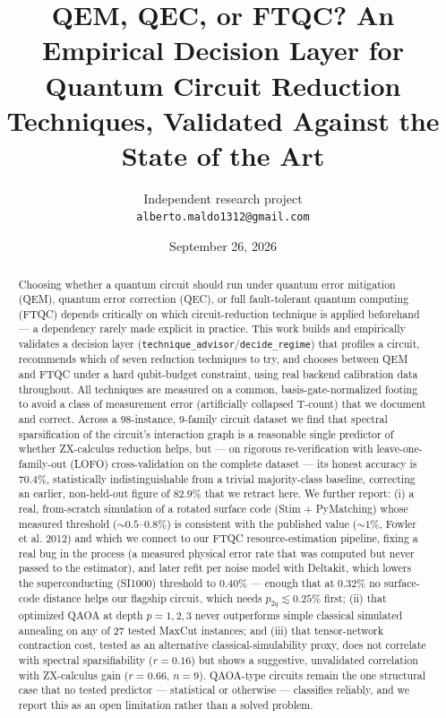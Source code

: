 \documentclass[9pt,twocolumn]{extarticle}
\title{\vspace{-1.2cm}\textbf{QEM, QEC, or FTQC? An Empirical Decision Layer for\\
Quantum Circuit Reduction Techniques, Validated Against the State of the Art}}
\author{\footnotesize Independent research project \\[-2pt]
\footnotesize \texttt{alberto.maldo1312@gmail.com}}
\date{\footnotesize September 26, 2026}
\begin{document}
\maketitle

\begin{abstract}
\noindent
Choosing whether a quantum circuit should run under quantum error mitigation
(QEM), quantum error correction (QEC), or full fault-tolerant quantum
computing (FTQC) depends critically on which circuit-reduction technique is
applied beforehand --- a dependency rarely made explicit in practice. This
work builds and empirically validates a decision layer
(\texttt{technique\_advisor}/\texttt{decide\_regime}) that profiles a circuit,
recommends which of seven reduction techniques to try, and chooses between
QEM and FTQC under a hard qubit-budget constraint, using real backend
calibration data throughout. All techniques are measured on a common,
basis-gate-normalized footing to avoid a class of measurement error
(artificially collapsed T-count) that we document and correct. Across a
98-instance, 9-family circuit dataset we find that spectral sparsification of
the circuit's interaction graph is a reasonable single predictor of whether
ZX-calculus reduction helps, but --- on rigorous re-verification with
leave-one-family-out (LOFO) cross-validation on the complete dataset --- its
honest accuracy is $70.4\%$, statistically indistinguishable from a trivial
majority-class baseline, correcting an earlier, non-held-out figure of
$82.9\%$ that we retract here. We further report: (i) a real, from-scratch
simulation of a rotated surface code (Stim + PyMatching) whose measured
threshold ($\sim\!0.5$--$0.8\%$) is consistent with the published value
($\sim\!1\%$, Fowler et al. 2012) and which we connect to our FTQC
resource-estimation pipeline, fixing a real bug in the process (a measured
physical error rate that was computed but never passed to the estimator),
and later refit per noise model with Deltakit, which lowers the
superconducting (SI1000) threshold to $0.40\%$ --- enough that at $0.32\%$ no
surface-code distance helps our flagship circuit, which needs
$p_{2q}\lesssim0.25\%$ first;
(ii) that optimized QAOA at depth $p=1,2,3$ never outperforms simple
classical simulated annealing on any of 27 tested MaxCut instances; and
(iii) that tensor-network contraction cost, tested as an alternative
classical-simulability proxy, does not correlate with spectral
sparsifiability ($r=0.16$) but shows a suggestive, unvalidated correlation
with ZX-calculus gain ($r=0.66$, $n=9$). QAOA-type circuits remain the one
structural case that no tested predictor --- statistical or otherwise ---
classifies reliably, and we report this as an open limitation rather than
a solved problem.
\end{abstract}
\end{document}
